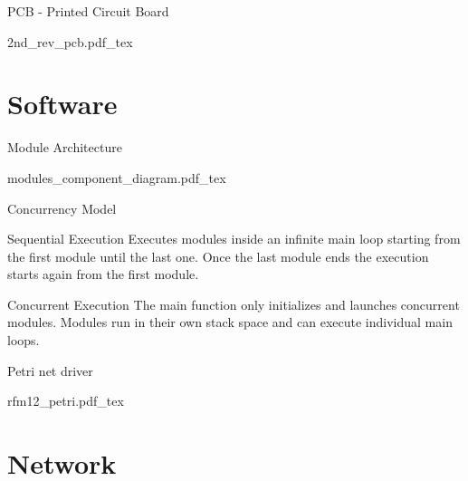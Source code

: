 \begin{frame}{PCB - Printed Circuit Board}
\begin{center}
\scalebox{0.59} {
    {2nd_rev_pcb.pdf_tex}
}
\end{center}
\end{frame}

\section{Software}
\begin{frame}{Module Architecture}
\begin{center}
\scalebox{0.8} {
    {modules_component_diagram.pdf_tex}
}
\end{center} 
\end{frame}

\begin{frame}{Concurrency Model}
\begin{block}{Sequential Execution}
Executes modules inside an infinite main loop starting from the first module until the last one.
Once the last module ends the execution starts again from the first module.
\end{block}
\begin{block}{Concurrent Execution}
The main function only initializes and launches concurrent modules. Modules run in their own stack space and can execute individual main loops.
\end{block}
\end{frame}

\begin{frame}{Petri net driver}
\begin{center}
\scalebox{0.8} {
    {rfm12_petri.pdf_tex}
}
\end{center}
\end{frame}

\section{Network}

